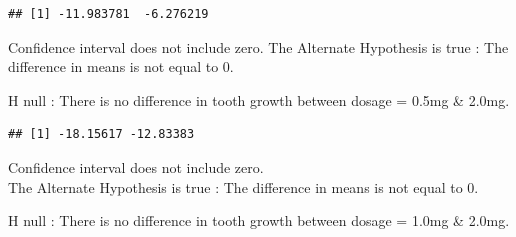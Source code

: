 \documentclass[]{article}
\newenvironment{Shaded}{\begin{snugshade}}{\end{snugshade}}
\newcommand{\KeywordTok}[1]{\textcolor[rgb]{0.13,0.29,0.53}{\textbf{{#1}}}}
\newcommand{\DecValTok}[1]{\textcolor[rgb]{0.00,0.00,0.81}{{#1}}}
\newcommand{\FloatTok}[1]{\textcolor[rgb]{0.00,0.00,0.81}{{#1}}}
\newcommand{\StringTok}[1]{\textcolor[rgb]{0.31,0.60,0.02}{{#1}}}
\newcommand{\NormalTok}[1]{{#1}}
\begin{document}
\begin{Shaded}
\end{Shaded}

\begin{verbatim}
## [1] -11.983781  -6.276219
\end{verbatim}

Confidence interval does not include zero. The Alternate Hypothesis is
true : The difference in means is not equal to 0.

H null : There is no difference in tooth growth between dosage = 0.5mg
\& 2.0mg.

\begin{Shaded}
\end{Shaded}

\begin{verbatim}
## [1] -18.15617 -12.83383
\end{verbatim}

Confidence interval does not include zero.\\The Alternate Hypothesis is
true : The difference in means is not equal to 0.

H null : There is no difference in tooth growth between dosage = 1.0mg
\& 2.0mg.

\begin{Shaded}
\end{Shaded}
\end{document}
